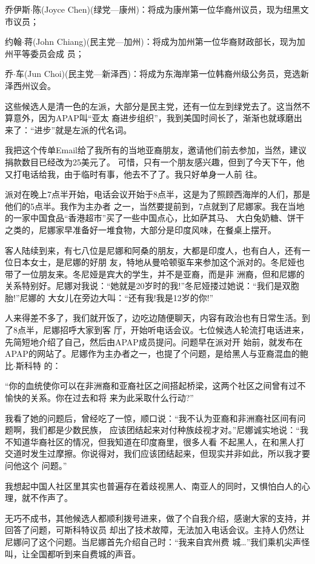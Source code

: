 ﻿\documentclass[11pt]{article}
\begin{document}
乔伊斯$\cdot$陈(Joyce Chen)(绿党---康州)：将成为康州第一位华裔州议员，现为纽黑文市议员；

约翰$\cdot$蒋(John Chiang)(民主党---加州)：将成为加州第一位华裔财政部长，现为加州平等委员会成
员；

乔$\cdot$车(Jun Choi)(民主党---新泽西)：将成为东海岸第一位韩裔州级公务员，竞选新泽西州议会。

这些候选人是清一色的左派，大部分是民主党，还有一位左到绿党去了。这当然不算意外，因为APAP叫``亚太
裔进步组织''，我到美国时间长了，渐渐也就琢磨出来了：``进步''就是左派的代名词。

我把这个传单Email给了我所有的当地亚裔朋友，邀请他们前去参加，当然，建议捐款数目已经改为25美元了。
可惜，只有一个朋友感兴趣，但到了今天下午，他又打电话给我，由于临时有事，他去不了了。我只好单身一人前
往。

派对在晚上7点半开始，电话会议开始于8点半，这是为了照顾西海岸的人们，那是他们的5点半。我作为主办者
之一，当然要提前到，7点就到了尼娜家。我在当地的一家中国食品``香港超市''买了一些中国点心，比如萨其马、
大白兔奶糖、饼干之类的，尼娜家早准备好一堆食物，大部分是印度风味，在餐桌上摆开。

客人陆续到来，有七八位是尼娜和阿桑的朋友，大都是印度人，也有白人，还有一位日本女士，是尼娜的好朋
友，特地从曼哈顿驱车来参加这个派对的。冬尼娅也带了一位朋友来。冬尼娅是宾大的学生，并不是亚裔，而是非
洲裔，但和尼娜的关系特别好。尼娜对我说：``她就是20岁时的我!''冬尼娅搂过她说：``我们是双胞胎!''尼娜的
大女儿在旁边大叫：``还有我!我是12岁的你!''

人来得差不多了，我们就开饭了，边吃边随便聊天，内容有政治也有日常生活。到了8点半，尼娜招呼大家到客
厅，开始听电话会议。七位候选人轮流打电话进来，先简短地介绍了自己，然后由APAP成员提问。问题早在派对开
始前，就发布在APAP的网站了。尼娜作为主办者之一，也提了个问题，是给黑人与亚裔混血的鲍比$\cdot$斯科特
的：

``你的血统使你可以在非洲裔和亚裔社区之间搭起桥梁，这两个社区之间曾有过不愉快的关系。你在过去和将
来为此采取什么行动?''


我看了她的问题后，曾经吃了一惊，顺口说：``我不认为亚裔和非洲裔社区间有问题啊，我们都是少数民族，
应该团结起来对付种族歧视才对。''尼娜诚实地说：``我不知道华裔社区的情况，但我知道在印度裔里，很多人看
不起黑人，在和黑人打交道时发生过摩擦。你说得对，我们应该团结起来，但现实并非如此，所以我才要问他这个
问题。''

我想起中国人社区里其实也普遍存在着歧视黑人、南亚人的同时，又惧怕白人的心理，就不作声了。

无巧不成书，其他候选人都顺利拨号进来，做了个自我介绍，感谢大家的支持，并回答了问题，可斯科特议员
却出了技术故障，无法加入电话会议。主持人仍然让尼娜问了这个问题。当尼娜首先介绍自己时：``我来自宾州费
城\ldots ''我们乘机尖声怪叫，让全国都听到来自费城的声音。
\end{document}
